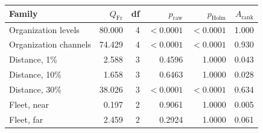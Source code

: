\begin{tabular}{lrrrrr}
\toprule
Family & $Q_{\mathrm{Fr}}$ & df & $p_{\mathrm{raw}}$ & $p_{\mathrm{Holm}}$ & $A_{\mathrm{rank}}$ \\
\midrule
Organization levels & 80.000 & 4 & $<0.0001$ & $<0.0001$ & 1.000 \\
Organization channels & 74.429 & 4 & $<0.0001$ & $<0.0001$ & 0.930 \\
Distance, 1\% & 2.588 & 3 & 0.4596 & 1.0000 & 0.043 \\
Distance, 10\% & 1.658 & 3 & 0.6463 & 1.0000 & 0.028 \\
Distance, 30\% & 38.026 & 3 & $<0.0001$ & $<0.0001$ & 0.634 \\
Fleet, near & 0.197 & 2 & 0.9061 & 1.0000 & 0.005 \\
Fleet, far & 2.459 & 2 & 0.2924 & 1.0000 & 0.061 \\
\bottomrule
\end{tabular}
